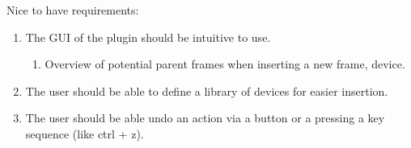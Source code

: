 Nice to have requirements:
\begin{enumerate}
	\item The GUI of the plugin should be intuitive to use.
	\begin{enumerate}
		\item Overview of potential parent frames when inserting a new frame, device.
	\end{enumerate}
	\item The user should be able to define a library of devices for easier insertion.
	\item The user should be able undo an action via a button or a pressing a key sequence (like ctrl + z).
\end{enumerate}
